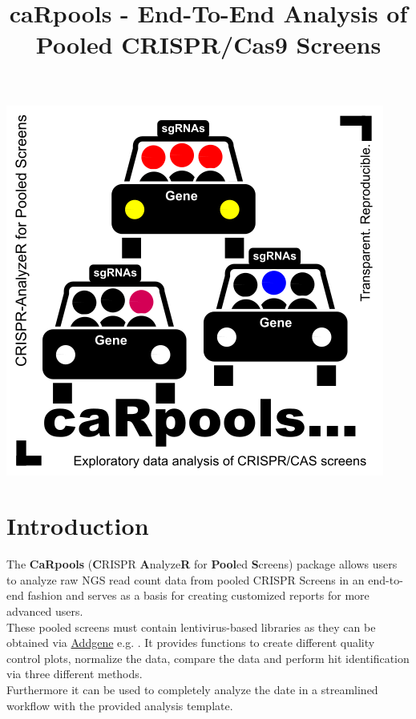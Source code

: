 \documentclass[]{article}
\title{caRpools - End-To-End Analysis of Pooled CRISPR/Cas9 Screens}
\author{}
\date{}
\begin{document}
\maketitle

{
\hypersetup{linkcolor=black}
\setcounter{tocdepth}{4}
\tableofcontents
}
\newpage

\begin{center}
\includegraphics{./pictures/CaRpools.png}
\end{center}

\newpage

\section{Introduction}\label{introduction}

The \textbf{CaRpools} (\textbf{C}RISPR \textbf{A}nalyze\textbf{R} for
\textbf{Pool}ed \textbf{S}creens) package allows users to analyze raw
NGS read count data from pooled CRISPR Screens in an end-to-end fashion
and serves as a basis for creating customized reports for more advanced
users.\\
These pooled screens must contain lentivirus-based libraries as they can
be obtained via
\href{https://www.addgene.org/CRISPR/libraries/}{Addgene} e.g. . It
provides functions to create different quality control plots, normalize
the data, compare the data and perform hit identification via three
different methods.\\
Furthermore it can be used to completely analyze the date in a
streamlined workflow with the provided analysis template.
\end{document}
